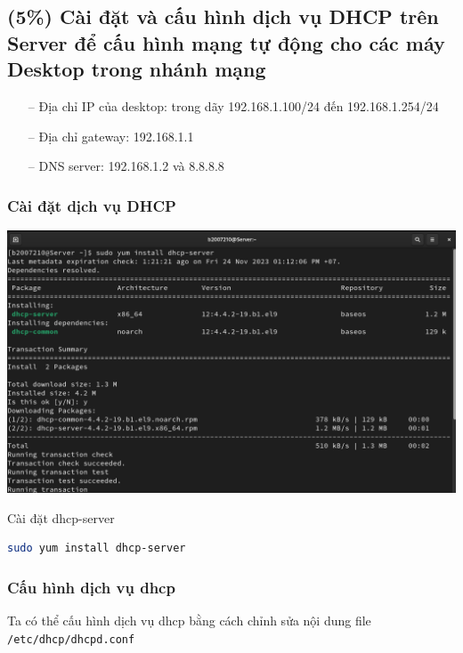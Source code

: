 \documentclass[a4paper, 11pt]{article}
\begin{document}
\subsection{(5\%) Cài đặt và cấu hình dịch vụ DHCP trên Server để cấu hình mạng tự động cho các máy Desktop trong nhánh mạng}

\begin{itemize}
    \item[--] Địa chỉ IP của desktop: trong dãy 192.168.1.100/24 đến 192.168.1.254/24
    \item[--] Địa chỉ gateway:  192.168.1.1
    \item[--] DNS server: 192.168.1.2 và 8.8.8.8
\end{itemize}

\subsubsection{Cài đặt dịch vụ DHCP}

\begin{minipage}
    {\linewidth}
    \captionsetup{type=figure}
    \centering
    \includegraphics[width=\linewidth]{images/install-dhcp-server.png}
    \caption{Cài đặt dhcp-server}
    \label{figure:install-dhcp-server}
\end{minipage}
\begin{lstlisting}[language=bash, caption=Cài đặt dịch vụ DHCP]
sudo yum install dhcp-server
\end{lstlisting}

\subsubsection{Cấu hình dịch vụ dhcp}

Ta có thể cấu hình dịch vụ dhcp bằng cách chỉnh sửa nội dung file \texttt{/etc/dhcp/dhcpd.conf}
\end{document}
